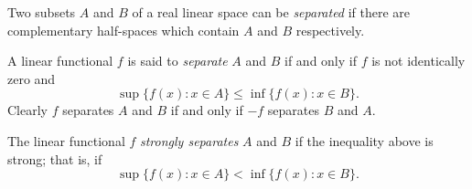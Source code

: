Two subsets $A$ and $B$ of a real linear space can be \textit{separated} if there are complementary half-spaces which contain $A$ and $B$ respectively.

A linear functional $f$ is said to \textit{separate} $A$ and $B$ if and only if $f$ is not identically zero and
$$\sup\{f(x) : x \in A\} \leq \inf\{f(x) : x \in B\}.$$
Clearly $f$ separates $A$ and $B$ if and only if $-f$ separates $B$ and $A$.

The linear functional $f$ \textit{strongly separates} $A$ and $B$ if the inequality above is strong; that is, if
$$\sup\{f(x) : x \in A\} < \inf\{f(x) : x \in B\}.$$
